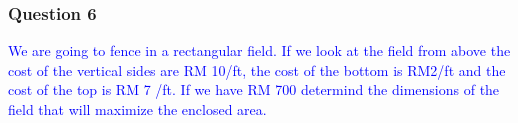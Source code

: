 \documentclass[12pt,fleqn]{beamer}
\newcommand{\question}[1]{\textcolor{blue}{#1}}
\begin{document}
\begin{frame}[t]
{\begin{minipage}{1.60\textwidth}
\begin{columns}
\vspace{0.5em}

\vspace{0.5em}

\vspace{0.5em}

\end{columns}
\end{minipage}}

\end{frame}

\begin{frame}[t]
\frametitle{Question 6}

\question{We are going to fence in a rectangular field. If we look at the field from above the cost of the vertical sides are RM 10/ft, the cost of the bottom is RM2/ft and the cost of the top is RM 7 /ft. If we have RM 700 determind the dimensions of the field that will maximize the enclosed area.}

\end{frame}
\end{document}
